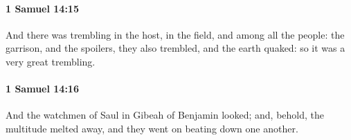 		\paragraph{1 Samuel 14:15} %
			\label{1SAMUEL-14-15}

			And there was trembling in the host, in the field, and among all the people: the garrison, and the spoilers, they also trembled, and the earth quaked: so it was a very great trembling.


		\paragraph{1 Samuel 14:16} %
			\label{1SAMUEL-14-16}

			And the watchmen of Saul in Gibeah of Benjamin looked; and, behold, the multitude melted away, and they went on beating down one another.


